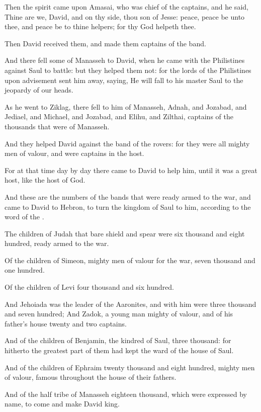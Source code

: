 \verse Then the spirit came upon Amasai, who was chief of the captains, and he said, Thine are we, David, and on thy side, thou son of Jesse: peace, peace be unto thee, and peace be to thine helpers; for thy God helpeth thee.

Then David received them, and made them captains of the band.

\verse And there fell some of Manasseh to David, when he came with the Philistines against Saul to battle: but they helped them not: for the lords of the Philistines upon advisement sent him away, saying, He will fall to his master Saul to the jeopardy of our heads.

\verse As he went to Ziklag, there fell to him of Manasseh, Adnah, and Jozabad, and Jediael, and Michael, and Jozabad, and Elihu, and Zilthai, captains of the thousands that were of Manasseh.

\verse And they helped David against the band of the rovers: for they were all mighty men of valour, and were captains in the host.

\verse For at that time day by day there came to David to help him, until it was a great host, like the host of God.

\verse And these are the numbers of the bands that were ready armed to the war, and came to David to Hebron, to turn the kingdom of Saul to him, according to the word of the \LORD.

\verse The children of Judah that bare shield and spear were six thousand and eight hundred, ready armed to the war.

\verse Of the children of Simeon, mighty men of valour for the war, seven thousand and one hundred.

\verse Of the children of Levi four thousand and six hundred.

\verse And Jehoiada was the leader of the Aaronites, and with him were three thousand and seven hundred; \verse And Zadok, a young man mighty of valour, and of his father's house twenty and two captains.

\verse And of the children of Benjamin, the kindred of Saul, three thousand: for hitherto the greatest part of them had kept the ward of the house of Saul.

\verse And of the children of Ephraim twenty thousand and eight hundred, mighty men of valour, famous throughout the house of their fathers.

\verse And of the half tribe of Manasseh eighteen thousand, which were expressed by name, to come and make David king.

